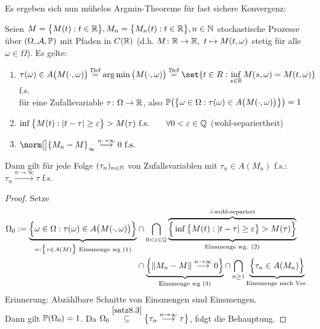 Es ergeben sich nun mühelos Argmin-Theoreme für fast sichere Konvergenz:

\begin{satz}\label{satz8.5}
	Seien $M=\big\lbrace M(t):t\in \R\big\rbrace,M_n=\big\lbrace M_n(t):t\in \R\big\rbrace,n\in\N$ stochastische Prozesse über $(\Omega,\A,\P)$ mit Pfaden in $C(\R)$ (d.h. $M\colon \R\to\R,~t\mapsto M(t,\omega)$ stetig für alle $\omega\in\Omega$).
	Es gelte:
	\begin{enumerate}[label=(\arabic*)]
		\item $\begin{aligned}
			\tau(\omega)\in A\big(M(\cdot,\omega)\big)\overset{\Def}{=}
			\argmin\big(M(\cdot,\omega)\big)
			\overset{\Def}{=}\set{t\in R:\inf\limits_{s\in\R}M(s,\omega)=M(t,\omega)}
		\end{aligned}$ f.s.\\
		für eine Zufallsvariable $\tau\colon\Omega\to\R$, also $\P\big(\big\lbrace\omega\in\Omega:\tau(\omega)\in A\big(M(\cdot,\omega)\big)\big\rbrace\big)=1$
		\item $\begin{aligned}
			\inf\limits\big\lbrace M(t):|t-\tau|\geq\varepsilon\big\rbrace>M(\tau)\text{ f.s.}\qquad\forall 0<\varepsilon\in\Q
		\end{aligned}$ (wohl-separiertheit)
		\item $\begin{aligned}
			\norm[\big]{M_n-M}_\infty\overset{n\to\infty}{\longrightarrow}0\text{ f.s.}
		\end{aligned}$
	\end{enumerate}
	Dann gilt für jede Folge $(\tau_n)_{n\in\N}$ von Zufallsvariablen mit $\tau_n\in A(M_n)$ f.s.:
	$\tau_n\overset{n\to\infty}{\longrightarrow}\tau$ f.s.
\end{satz}

\begin{proof}
	Setze
	\begin{align*}
		\Omega_0:=\underbrace{\Big\lbrace\omega\in\Omega:\tau(\omega)\in A\big(M(\cdot,\omega)\big)\Big\rbrace}_{=:\big\lbrace\tau\in A(M)\big\rbrace\text{ Einsmenge wg (1)}}
		&\cap\bigcap\limits_{0<\varepsilon\in\Q}
		\overbrace{\underbrace{\Big\lbrace\inf\limits\big\lbrace M(t):|t-\tau|\geq\varepsilon\big\rbrace>M(\tau)\Big\rbrace}_{\text{Einsmenge wg. (2)}}}^{\hat{=}\text{wohl-separiert}}\\
		&\cap\underbrace{\Big\lbrace\Vert M_n-M\Vert\overset{n\to\infty}{\longrightarrow}0\Big\rbrace}_{\text{Einsmenge wg (3)}}
		\cap\bigcap\limits_{n\geq1}\underbrace{\Big\lbrace\tau_n\in A(M_n)\Big\rbrace}_{\text{Einsmenge nach Vor.}}
	\end{align*}
	Erinnerung: Abzählbare Schnitte von Einsmengen sind Einsmengen.\\
	Dann gilt $\P(\Omega_0)=1$. 
	Da $\Omega_0\overset{\ref{satz8.3}}{\subseteq}\big\lbrace\tau_n\overset{n\to\infty}{\longrightarrow}\tau\big\rbrace$, folgt die Behauptung.
\end{proof}

